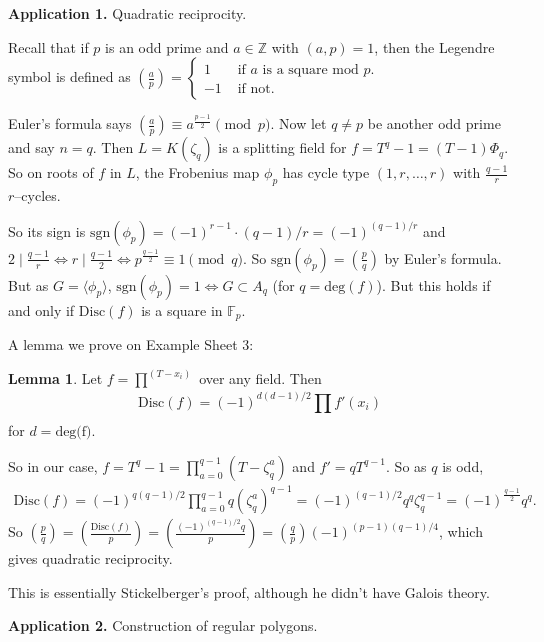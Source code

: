 \documentclass{article}
\theoremstyle{definition}
\newtheorem{lemma}[theorem]{Lemma}
\begin{document}
\textbf{Application 1.} Quadratic reciprocity.

Recall that if $p$ is an odd prime and $a \in \mathbb{Z}$ with $(a,p)=1$, then the Legendre symbol is defined as $\left( \frac{a}{p} \right) = \begin{cases}
    1 &\text{ if } a \text{ is a square mod }p.\\
    -1 &\text{ if not.}
\end{cases}$
\vspace{1mm}

Euler's formula says $\left( \frac{a}{p} \right) \equiv a^{\frac{p-1}{2}} \pmod{p}$. Now let $q \neq p$ be another odd prime and say $n=q$. Then $L=K(\zeta_q)$ is a splitting field for $f=T^q-1 = (T-1)\Phi_q$. So on roots of $f$ in $L$, the Frobenius map $\phi_p$ has cycle type $(1,r,\ldots,r)$ with $\frac{q-1}{r}$ $r$--cycles. 

So its sign is $\text{sgn}(\phi_p) = (-1)^{r-1}\cdot (q-1)/r = (-1)^{(q-1)/r}$ and $2 \mid \frac{q-1}{r} \iff r \mid \frac{q-1}{2} \iff p^{\frac{q-1}{2}} \equiv 1 \pmod{q}$. So $\text{sgn}(\phi_p) = \left( \frac{p}{q} \right)$ by Euler's formula. But as $G = \langle \phi_p \rangle$, $\text{sgn}(\phi_p) = 1 \iff G \subset A_q$ (for $q=\text{deg}(f)$). But this holds if and only if $\text{Disc}(f)$ is a square in $\mathbb{F}_p$.
\vspace{1mm}

A lemma we prove on Example Sheet 3:
\begin{lemma}
    Let $f=\prod_{}^{(T-x_i)}$ over any field. Then $$\text{Disc}(f)= (-1)^{d(d-1)/2}\prod_{}^{} f'(x_i)$$ for $d=\text{deg(f)}$.
\end{lemma}

So in our case, $f=T^q-1 = \prod_{a=0}^{q-1} (T-\zeta_q^a)$ and $f'=qT^{q-1}$. So as $q$ is odd, 
\begin{align*}
    \text{Disc}(f) = (-1)^{q(q-1)/2} \prod_{a=0}^{q-1} q (\zeta_q^a)^{q-1} = (-1)^{(q-1)/2}q^q \zeta_q^{q-1} = (-1)^{\frac{q-1}{2}}q^q.
\end{align*}
So $\left( \frac{p}{q} \right)  = \left( \frac{\text{Disc}(f)}{p} \right) =\left( \frac{(-1)^{(q-1)/2}q}{p} \right) = \left( \frac{q}{p} \right) (-1)^{(p-1)(q-1)/4}$, which gives quadratic reciprocity.

This is essentially Stickelberger's proof, although he didn't have Galois theory.
\vspace{1mm}

\textbf{Application 2.} Construction of regular polygons.
\vspace{1mm}
\end{document}
